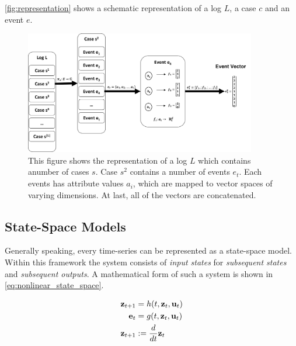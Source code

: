 \documentclass[./../../paper.tex]{subfiles}
\begin{document}
\autoref{fig:representation} shows a schematic representation of a log $L$, a case $c$ and an event $e$.


\begin{figure}[htbp]
    \centering
    \includegraphics[width=0.9\textwidth]{figures/Graphics/Slide4.PNG}
    \caption{This figure shows the representation of a log $L$ which contains anumber of cases $s$. Case $s^2$ contains a number of events $e_t$. Each events has attribute values $a_i$, which are mapped to vector spaces of varying dimensions. At last, all of the vectors are concatenated.}
    \label{fig:representation}
\end{figure}




\subsection{State-Space Models}
Generally speaking, every time-series can be represented as a state-space model\autocite{kalman_NewApproachLinear_1960}. Within this framework the system consists of \emph{input states} for \emph{subsequent states} and \emph{subsequent outputs}. A mathematical form of such a system is shown in \autoref{eq:nonlinear_state_space}.

\begin{align}
    \label{eq:nonlinear_state_space}
    \mathbf{z}_{t+1} & =h(t, \mathbf{z}_t, \mathbf{u}_t)           \\
    \mathbf{e}_t   & =g(t, \mathbf{z}_t, \mathbf{u}_t) \nonumber \\
    \mathbf{z}_{t+1} &:=\frac{d}{d t} \mathbf{z}_t \nonumber
\end{align}
\end{document}
